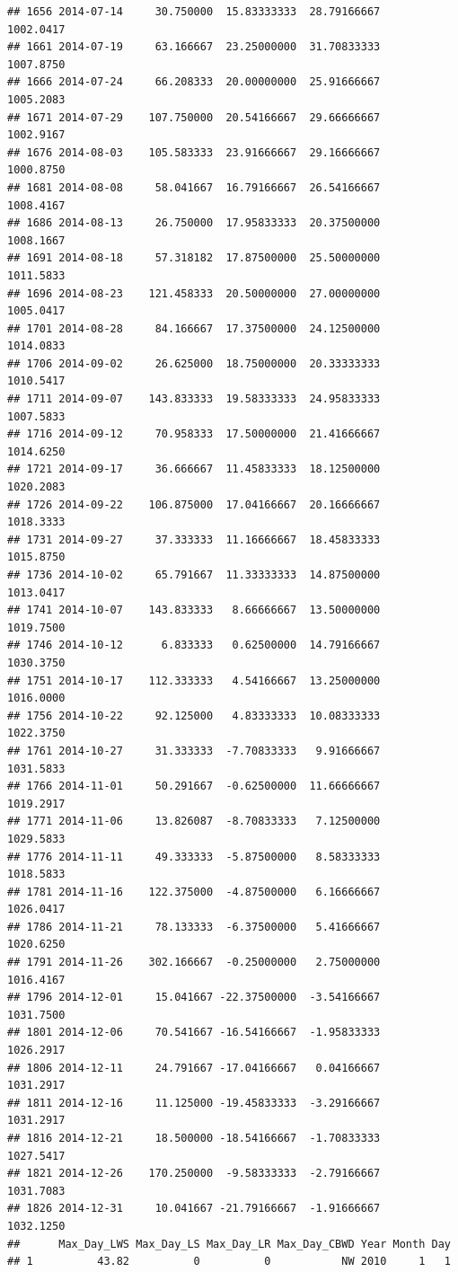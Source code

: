 \documentclass[
]{article}
\begin{document}
\begin{verbatim}
## 1656 2014-07-14     30.750000  15.83333333  28.79166667    1002.0417
## 1661 2014-07-19     63.166667  23.25000000  31.70833333    1007.8750
## 1666 2014-07-24     66.208333  20.00000000  25.91666667    1005.2083
## 1671 2014-07-29    107.750000  20.54166667  29.66666667    1002.9167
## 1676 2014-08-03    105.583333  23.91666667  29.16666667    1000.8750
## 1681 2014-08-08     58.041667  16.79166667  26.54166667    1008.4167
## 1686 2014-08-13     26.750000  17.95833333  20.37500000    1008.1667
## 1691 2014-08-18     57.318182  17.87500000  25.50000000    1011.5833
## 1696 2014-08-23    121.458333  20.50000000  27.00000000    1005.0417
## 1701 2014-08-28     84.166667  17.37500000  24.12500000    1014.0833
## 1706 2014-09-02     26.625000  18.75000000  20.33333333    1010.5417
## 1711 2014-09-07    143.833333  19.58333333  24.95833333    1007.5833
## 1716 2014-09-12     70.958333  17.50000000  21.41666667    1014.6250
## 1721 2014-09-17     36.666667  11.45833333  18.12500000    1020.2083
## 1726 2014-09-22    106.875000  17.04166667  20.16666667    1018.3333
## 1731 2014-09-27     37.333333  11.16666667  18.45833333    1015.8750
## 1736 2014-10-02     65.791667  11.33333333  14.87500000    1013.0417
## 1741 2014-10-07    143.833333   8.66666667  13.50000000    1019.7500
## 1746 2014-10-12      6.833333   0.62500000  14.79166667    1030.3750
## 1751 2014-10-17    112.333333   4.54166667  13.25000000    1016.0000
## 1756 2014-10-22     92.125000   4.83333333  10.08333333    1022.3750
## 1761 2014-10-27     31.333333  -7.70833333   9.91666667    1031.5833
## 1766 2014-11-01     50.291667  -0.62500000  11.66666667    1019.2917
## 1771 2014-11-06     13.826087  -8.70833333   7.12500000    1029.5833
## 1776 2014-11-11     49.333333  -5.87500000   8.58333333    1018.5833
## 1781 2014-11-16    122.375000  -4.87500000   6.16666667    1026.0417
## 1786 2014-11-21     78.133333  -6.37500000   5.41666667    1020.6250
## 1791 2014-11-26    302.166667  -0.25000000   2.75000000    1016.4167
## 1796 2014-12-01     15.041667 -22.37500000  -3.54166667    1031.7500
## 1801 2014-12-06     70.541667 -16.54166667  -1.95833333    1026.2917
## 1806 2014-12-11     24.791667 -17.04166667   0.04166667    1031.2917
## 1811 2014-12-16     11.125000 -19.45833333  -3.29166667    1031.2917
## 1816 2014-12-21     18.500000 -18.54166667  -1.70833333    1027.5417
## 1821 2014-12-26    170.250000  -9.58333333  -2.79166667    1031.7083
## 1826 2014-12-31     10.041667 -21.79166667  -1.91666667    1032.1250
##      Max_Day_LWS Max_Day_LS Max_Day_LR Max_Day_CBWD Year Month Day
## 1          43.82          0          0           NW 2010     1   1

\end{verbatim}
\end{document}
